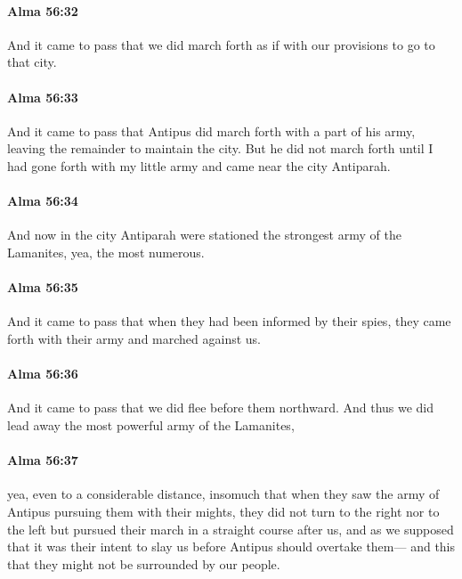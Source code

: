 		\paragraph{Alma 56:32} %
			\label{ALMA-56-32}

			And it came to pass that we did march forth
			as if with our provisions to go to that city.

		\paragraph{Alma 56:33} %
			\label{ALMA-56-33}

			And it came to pass that Antipus did march forth with a part of his army,
			leaving the remainder to maintain the city.
			But he did not march forth
			until I had gone forth with my little army and came near the city Antiparah.

		\paragraph{Alma 56:34} %
			\label{ALMA-56-34}

			And now in the city Antiparah were stationed
			the strongest army of the Lamanites,
			yea, the most numerous.

		\paragraph{Alma 56:35} %
			\label{ALMA-56-35}

			And it came to pass that when they had been informed by their spies,
			they came forth with their army and marched against us.

		\paragraph{Alma 56:36} %
			\label{ALMA-56-36}

			And it came to pass that we did flee before them northward.
			And thus we did lead away the most powerful army of the Lamanites,

		\paragraph{Alma 56:37} %
			\label{ALMA-56-37}

			yea, even to a considerable distance,
			insomuch that when they saw the army of Antipus pursuing them with their mights,
			they did not turn to the right nor to the left
			but pursued their march in a straight course after us,
			and as we supposed that it was their intent to slay us
			before Antipus should overtake them---
			and this that they might not be surrounded by our people.

